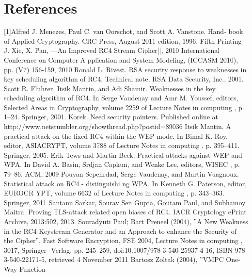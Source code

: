 \documentclass[conference]{IEEEtran}
\begin{document}
\section*{References}
[1]Alfred J. Menezes, Paul C. van Oorschot, and Scott A.
Vanstone. Hand- book of Applied Cryptography. CRC Press,
August 2011 edition, 1996. Fifth Printing
\newline
[2] J. Xie, X. Pan, —An Improved RC4 Stream Cipher||,
2010 International Conference on Computer A pplication and
System Modeling, (ICCASM 2010), pp. (V7) 156-159, 2010
\newline
[3]Ronald L. Rivest. RSA security response to weaknesses in
key scheduling algorithm of RC4. Technical note, RSA Data
Security, Inc., 2001.
\newline
[4] Scott R. Fluhrer, Itsik Mantin, and Adi Shamir. Weaknesses
in the key scheduling algorithm of RC4. In Serge Vaudenay
and Amr M. Youssef, editors, Selected Areas in Cryptography,
volume 2259 of Lecture Notes in computing , p. 1–24.
Springer, 2001.
\newline
[5] Korek. Need security pointers. Published online at
http://www.netstumbler.org/showthread.php?postid=89036
\newline
[6] Itsik Mantin. A practical attack on the fixed RC4 within the
WEP mode. In Bimal K. Roy, editor, ASIACRYPT, volume
3788 of Lecture Notes in computing , p. 395–411.
Springer, 2005.
\newline
[7] Erik Tews and Martin Beck. Practical attacks against
WEP and WPA. In David A. Basin, Srdjan Capkun, and
Wenke Lee, editors, WISEC , p. 79–86. ACM, 2009
\newline
[8] Pouyan Sepehrdad, Serge Vaudenay, and Martin Vuagnoux.
Statistical attack on RC4 - distinguishi ng WPA. In Kenneth
G. Paterson, editor, EUROCR YPT, volume 6632 of Lecture
Notes in computing , p. 343–363. Springer, 2011
\newline
[9] Santanu Sarkar, Sourav Sen Gupta, Goutam Paul, and
Subhamoy Maitra. Proving TLS-attack related open biases of
RC4. IACR Cryptology ePrint Archive, 2013:502, 2013.
\newline
[10]Souradyuti Paul; Bart Preneel (2004), ”A New Weakness
in the RC4 Keystream Generator and an Approach to enhance
the Security of the Cipher”, Fast Software Encryption, FSE
2004, Lecture Notes in computing , 3017, Springer-
Verlag, pp. 245–259, doi:10.1007/978-3-540-25937-4 16,
ISBN 978-3-540-22171-5, retrieved 4 November 2011
\newline
[11]Bartosz Zoltak (2004), ”VMPC One-Way Function
\end{document}

